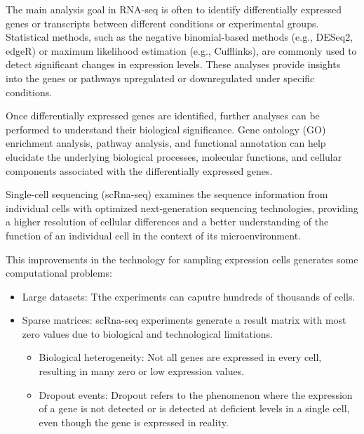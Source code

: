 \documentclass[aps,prb,twocolumn,superscriptaddress,floatfix,longbibliography]{revtex4-2}
\newif\ifptitle
\newif\ifpnumber
\newcounter{para}
\newcommand\ptitle[1]{\par\refstepcounter{para}
{\ifpnumber{\noindent\textcolor{lightgray}{\textbf{\thepara}}\indent}\fi}
{\ifptitle{\textbf{[{#1}]}}\fi}}
\begin{document}
The main analysis goal in RNA-seq is often to identify differentially expressed genes or transcripts between different conditions or experimental groups. Statistical methods, such as the negative binomial-based methods (e.g., DESeq2, edgeR) or maximum likelihood estimation (e.g., Cufflinks), are commonly used to detect significant changes in expression levels. These analyses provide insights into the genes or pathways upregulated or downregulated under specific conditions.

Once differentially expressed genes are identified, further analyses can be performed to understand their biological significance. Gene ontology (GO) enrichment analysis, pathway analysis, and functional annotation can help elucidate the underlying biological processes, molecular functions, and cellular components associated with the differentially expressed genes.


\vspace{2mm}

\ptitle{Single-cell sequencing} \cite{triumphs-and-limitations-scrna}

Single-cell sequencing (scRna-seq) examines the sequence information from individual cells with optimized next-generation sequencing technologies, providing a higher resolution of cellular differences and a better understanding of the function of an individual cell in the context of its microenvironment.

This improvements in the technology for sampling expression cells generates some computational problems:
\begin{itemize}
 \item Large datasets: Tthe experiments can caputre hundreds of thousands of cells.
 \item Sparse matrices: scRna-seq experiments generate a result matrix with most zero values due to biological and technological limitations.
 \begin{itemize}
    \item Biological heterogeneity: Not all genes are expressed in every cell, resulting in many zero or low expression values.
    \item Dropout events: Dropout refers to the phenomenon where the expression of a gene is not detected or is detected at deficient levels in a single cell, even though the gene is expressed in reality.
 \end{itemize}

\end{itemize}
\end{document}
